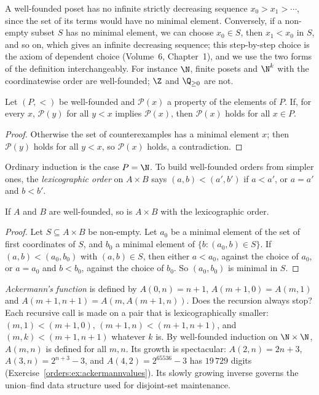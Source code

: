A well-founded poset has no infinite strictly decreasing sequence $x_0>x_1>\cdots$, since the set of its terms would have no
minimal element. Conversely, if a non-empty subset $S$ has no minimal element, we can choose $x_0\in S$, then $x_1<x_0$ in $S$, and so
on, which gives an infinite decreasing sequence; this step-by-step choice is the axiom of dependent choice (Volume~6,
Chapter~1), and we use the two forms of the definition interchangeably. For instance $\N$, finite posets and $\N^k$ with
the coordinatewise order are well-founded; $\Z$ and $\Q_{\ge0}$ are not.

\begin{theorem}\label{orders:thm:wfind}
Let $(P,<)$ be well-founded and $\mathcal P(x)$ a property of the elements of $P$. If, for every $x$, $\mathcal P(y)$ for all $y<x$ implies $\mathcal P(x)$,
then $\mathcal P(x)$ holds for all $x\in P$.
\end{theorem}
\begin{proof}
Otherwise the set of counterexamples has a minimal element $x$; then $\mathcal P(y)$ holds for all $y<x$, so $\mathcal P(x)$ holds, a
contradiction.
\end{proof}

Ordinary induction is the case $P=\N$. To build well-founded orders from simpler ones, the \emph{lexicographic order} on $A\times B$
says $(a,b)<(a',b')$ if $a<a'$, or $a=a'$ and $b<b'$.

\begin{proposition}\label{orders:prop:lex}
If $A$ and $B$ are well-founded, so is $A\times B$ with the lexicographic order.
\end{proposition}
\begin{proof}
Let $S\subseteq A\times B$ be non-empty. Let $a_0$ be a minimal element of the set of first coordinates of $S$, and $b_0$ a minimal element of
$\{b:(a_0,b)\in S\}$. If $(a,b)<(a_0,b_0)$ with $(a,b)\in S$, then either $a<a_0$, against the choice of $a_0$, or $a=a_0$ and $b<b_0$, against the choice of $b_0$.
So $(a_0,b_0)$ is minimal in $S$.
\end{proof}

\begin{example}\label{orders:ex:ackermann}
\emph{Ackermann's function} is defined by $A(0,n)=n+1$, $A(m+1,0)=A(m,1)$ and $A(m+1,n+1)=A(m,A(m+1,n))$. Does the recursion
always stop? Each recursive call is made on a pair that is lexicographically smaller: $(m,1)<(m+1,0)$, $(m+1,n)<(m+1,n+1)$,
and $(m,k)<(m+1,n+1)$ whatever $k$ is. By well-founded induction on $\N\times\N$, $A(m,n)$ is defined for all $m,n$. Its growth is
spectacular: $A(2,n)=2n+3$, $A(3,n)=2^{n+3}-3$, and $A(4,2)=2^{65536}-3$ has $19\,729$ digits (Exercise~\ref{orders:ex:ackermannvalues}). Its slowly
growing inverse governs the union--find data structure used for disjoint-set maintenance.
\end{example}

